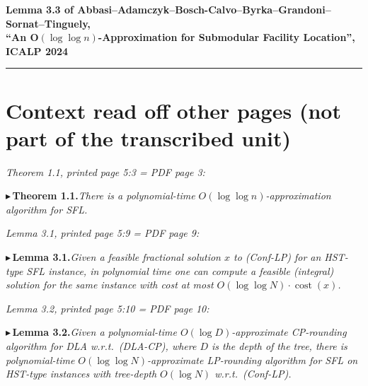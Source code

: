 \documentclass[11pt]{article}
\newcommand{\cost}{\operatorname{cost}}
\newcommand{\pitem}[2]{\par\medskip\noindent$\blacktriangleright$\,\textbf{#1}\;\textit{#2}\par\medskip}
\begin{document}
\begin{center}
{\large\bfseries Lemma 3.3 of Abbasi--Adamczyk--Bosch-Calvo--Byrka--Grandoni--Sornat--Tinguely,\\
``An O$(\log\log n)$-Approximation for Submodular Facility Location'', ICALP 2024}
\end{center}

\medskip
\noindent\rule{\textwidth}{0.6pt}

\section*{Context read off other pages (not part of the transcribed unit)}

\noindent\emph{Theorem 1.1, printed page 5:3 = PDF page 3:}
\pitem{Theorem 1.1.}{There is a polynomial-time $O(\log\log n)$-approximation algorithm for SFL.}

\noindent\emph{Lemma 3.1, printed page 5:9 = PDF page 9:}
\pitem{Lemma 3.1.}{Given a feasible fractional solution $x$ to (Conf-LP) for an HST-type SFL
instance, in polynomial time one can compute a feasible (integral) solution for the same
instance with cost at most $O(\log\log N)\cdot\cost(x)$.}

\noindent\emph{Lemma 3.2, printed page 5:10 = PDF page 10:}
\pitem{Lemma 3.2.}{Given a polynomial-time $O(\log D)$-approximate CP-rounding algorithm for
DLA w.r.t.\ (DLA-CP), where $D$ is the depth of the tree, there is polynomial-time
$O(\log\log N)$-approximate LP-rounding algorithm for SFL on HST-type instances with
tree-depth $O(\log N)$ w.r.t.\ (Conf-LP).}
\end{document}
